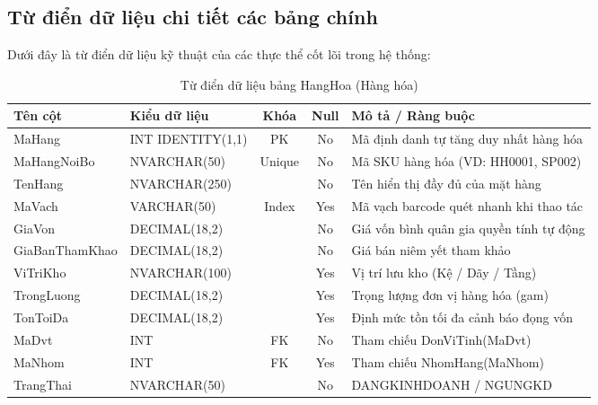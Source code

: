 \documentclass[12pt,a4paper]{report}
\renewcommand{\_}{\textunderscore\allowbreak}
\begin{document}
\subsection{Từ điển dữ liệu chi tiết các bảng chính}

Dưới đây là từ điển dữ liệu kỹ thuật của các thực thể cốt lõi trong hệ thống:

\begin{table}[H]
\centering
\small
\setlength{\tabcolsep}{4pt}
\renewcommand{\arraystretch}{1.15}
\begin{tabularx}{\textwidth}{|>{\raggedright\arraybackslash}p{3.4cm}|>{\raggedright\arraybackslash}p{3.2cm}|c|c|Y|}
\hline
{}
\textbf{Tên cột} & \textbf{Kiểu dữ liệu} & \textbf{Khóa} & \textbf{Null} & \textbf{Mô tả / Ràng buộc} \\
\hline
MaHang & INT IDENTITY(1,1) & PK & No & Mã định danh tự tăng duy nhất hàng hóa \\
\hline
MaHangNoiBo & NVARCHAR(50) & Unique & No & Mã SKU hàng hóa (VD: HH0001, SP002) \\
\hline
TenHang & NVARCHAR(250) & & No & Tên hiển thị đầy đủ của mặt hàng \\
\hline
MaVach & VARCHAR(50) & Index & Yes & Mã vạch barcode quét nhanh khi thao tác \\
\hline
GiaVon & DECIMAL(18,2) & & No & Giá vốn bình quân gia quyền tính tự động \\
\hline
GiaBan\-ThamKhao & DECIMAL(18,2) & & No & Giá bán niêm yết tham khảo \\
\hline
ViTriKho & NVARCHAR(100) & & Yes & Vị trí lưu kho (Kệ / Dãy / Tầng) \\
\hline
TrongLuong & DECIMAL(18,2) & & Yes & Trọng lượng đơn vị hàng hóa (gam) \\
\hline
TonToiDa & DECIMAL(18,2) & & Yes & Định mức tồn tối đa cảnh báo đọng vốn \\
\hline
MaDvt & INT & FK & No & Tham chiếu DonViTinh(MaDvt) \\
\hline
MaNhom & INT & FK & Yes & Tham chiếu NhomHang(MaNhom) \\
\hline
TrangThai & NVARCHAR(50) & & No & DANG\_KINH\_DOANH / NGUNG\_KD \\
\hline
\end{tabularx}
\caption{Từ điển dữ liệu bảng HangHoa (Hàng hóa)}
\label{tab:dict_hanghoa}
\end{table}
\end{document}
